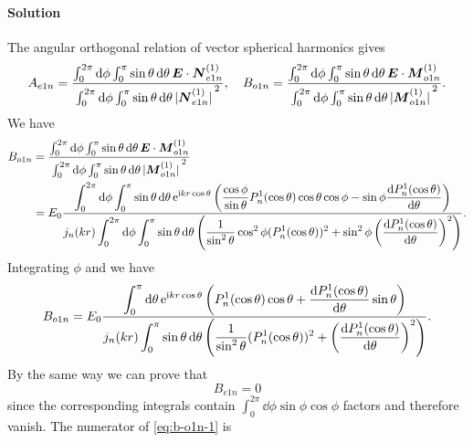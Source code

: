 \documentclass[hyperref, a4paper]{article}
\newcommand*{\ii}{\mathrm{i}}
\newcommand*{\ee}{\mathrm{e}}
\begin{document}
\paragraph{Solution} The angular orthogonal relation of vector spherical harmonics gives
\[
    A_{e1n} = \frac{\int_0^{2\pi} \dd{\phi} \int_0^\pi \sin \theta \dd{\theta} \vb*{E} \cdot \vb*{N}^{(1)}_{e1n}}{\int_0^{2\pi} \dd{\phi} \int_0^\pi \sin \theta \dd{\theta} \abs*{\vb*{N}_{e1n}^{(1)}}^2}, \quad B_{o1n} = \frac{\int_0^{2\pi} \dd{\phi} \int_0^\pi \sin \theta \dd{\theta} \vb*{E} \cdot \vb*{M}_{o1n}^{(1)}}{\int_0^{2\pi} \dd{\phi} \int_0^\pi \sin \theta \dd{\theta} \abs*{\vb*{M}^{(1)}_{o1n}}^2}.
\]
We have 
\[
    \begin{aligned}
        B_{o1n} &= \dfrac{\int_0^{2\pi} \dd{\phi} \int_0^\pi \sin \theta \dd{\theta} \vb*{E} \cdot \vb*{M}_{o1n}^{(1)}}{\int_0^{2\pi} \dd{\phi} \int_0^\pi \sin \theta \dd{\theta} \abs*{\vb*{M}^{(1)}_{o1n}}^2} \\
        &= E_0 \frac{\displaystyle \int_0^{2\pi} \dd{\phi} \int_0^\pi \sin \theta \dd{\theta} \ee^{\ii k r \cos \theta} \left( \frac{\cos\phi}{\sin\theta} P^1_n(\cos\theta) \cos\theta \cos\phi - \sin\phi \dv{P^1_n(\cos\theta)}{\theta} (-\sin\phi) \right)}{\displaystyle j_n(kr) \int_0^{2\pi} \dd{\phi} \int_0^\pi \sin \theta \dd{\theta} \left( \frac{1}{\sin^2 \theta} \cos^2\phi (P^1_n(\cos \theta))^2 + \sin^2\phi \left( \dv{P_n^1(\cos\theta)}{\theta} \right)^2 \right) }.
    \end{aligned}
\]
Integrating $\phi$ and we have 
\begin{equation}
    B_{o1n} = E_0 \frac{\displaystyle \int_0^\pi \dd{\theta} \ee^{\ii k r \cos \theta} \left( P^1_n(\cos\theta) \cos\theta + \dv{P^1_n(\cos\theta)}{\theta} \sin \theta \right)}{\displaystyle j_n(kr) \int_0^\pi \sin \theta \dd{\theta} \left( \frac{1}{\sin^2 \theta} (P^1_n(\cos \theta))^2 + \left( \dv{P_n^1(\cos\theta)}{\theta} \right)^2 \right) }.
    \label{eq:b-o1n-1}
\end{equation}
By the same way we can prove that 
\begin{equation}
    B_{e1n} = 0
\end{equation}
since the corresponding integrals contain $\int_0^{2\pi} \dd{\phi} \sin\phi \cos\phi$ factors and therefore vanish.
The numerator of \eqref{eq:b-o1n-1} is
\end{document}
